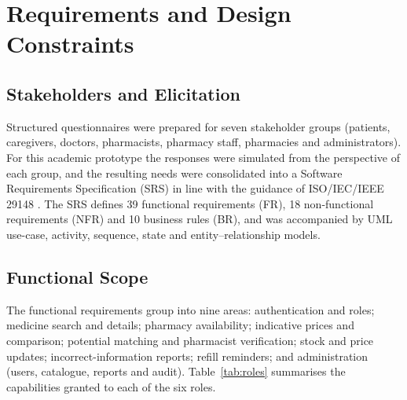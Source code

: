 \documentclass[conference]{IEEEtran}
\begin{document}
\section{Requirements and Design Constraints}\label{sec:req}

\subsection{Stakeholders and Elicitation}
Structured questionnaires were prepared for seven stakeholder groups (patients, caregivers, doctors, pharmacists, pharmacy staff, pharmacies and administrators). For this academic prototype the responses were simulated from the perspective of each group, and the resulting needs were consolidated into a Software Requirements Specification (SRS) in line with the guidance of ISO/IEC/IEEE 29148 \cite{iso29148}. The SRS defines 39 functional requirements (FR), 18 non-functional requirements (NFR) and 10 business rules (BR), and was accompanied by UML use-case, activity, sequence, state and entity--relationship models.

\subsection{Functional Scope}
The functional requirements group into nine areas: authentication and roles; medicine search and details; pharmacy availability; indicative prices and comparison; potential matching and pharmacist verification; stock and price updates; incorrect-information reports; refill reminders; and administration (users, catalogue, reports and audit). Table~\ref{tab:roles} summarises the capabilities granted to each of the six roles.
\end{document}
